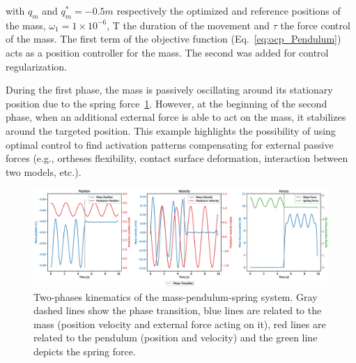 \noindent with $q_m$ and $q_m^* = -0.5m$ respectively the optimized and reference positions of the mass, $\omega_1 = 1\times 10^{-6}$, T the duration of the movement and $\tau$ the force control of the mass.
The first term of the objective function (Eq.~\ref{eq:ocp_Pendulum}) acts as a position controller for the mass.
The second was added for control regularization.


During the first phase, the mass is passively oscillating around its stationary position due to the spring force~\ref{fig:Mass_Pendulum_Fext_graphs}.
However, at the beginning of the second phase, when an additional external force is able to act on the mass, it stabilizes around the targeted position.
This example highlights the possibility of using optimal control to find activation patterns compensating for external passive forces (e.g., ortheses flexibility, contact surface deformation, interaction between two models, etc.).

\begin{figure}[t!]
\centering
\includegraphics[width=\textwidth]{figures/Mass_Pendulum_Fext_2.eps}
\caption{Two-phases kinematics of the mass-pendulum-spring system. Gray dashed lines show the phase transition, blue lines are related to the mass (position velocity and external force acting on it), red lines are related to the pendulum (position and velocity) and the green line depicts the spring force.}
\label{fig:Mass_Pendulum_Fext_graphs}
\end{figure}















